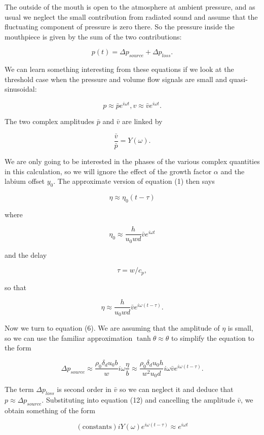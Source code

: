   The outside of the mouth is open to the atmosphere at ambient pressure, and 
  as usual we neglect the small contribution from radiated sound and assume 
  that the fluctuating component of pressure is zero there. So the pressure 
  inside the mouthpiece is given by the sum of the two contributions: 

  $$p(t)=\Delta p_{source} + \Delta p_{loss} . \tag{10}$$ 

  We can learn something interesting from these equations if we look at the 
  threshold case when the pressure and volume flow signals are small and 
  quasi-sinusoidal: 

  $$p \approx \bar{p}e^{i \omega t}, v \approx \bar{v}e^{i \omega t} . 
  \tag{11}$$ 

  The two complex amplitudes $\bar{p}$ and $\bar{v}$ are linked by 

  $$\dfrac{\bar{v}}{\bar{p}} = Y(\omega) . \tag{12}$$ 

  We are only going to be interested in the phases of the various complex 
  quantities in this calculation, so we will ignore the effect of the growth 
  factor $\alpha$ and the labium offset $y_0$. The approximate version of 
  equation (1) then says 

  $$\eta \approx \eta_0(t-\tau) \tag{13}$$ 

  where 

  $$\eta_0 \approx \dfrac{h}{u_0 w d} \bar{v} e^{i \omega t} \tag{14}$$ 

  and the delay 

  $$\tau=w/c_p, \tag{15}$$ 

  so that 

  $$\eta \approx \dfrac{h}{u_0 w d} \bar{v} e^{i \omega (t-\tau)} . \tag{16}$$ 

  Now we turn to equation (6). We are assuming that the amplitude of $\eta$ is 
  small, so we can use the familiar approximation $\tanh \theta \approx \theta$ 
  to simplify the equation to the form 

  $$\Delta p_{source} \approx \dfrac{\rho_0 \delta_d u_0 b}{w} i \omega 
  \dfrac{\eta}{b} \approx \dfrac{\rho_0 \delta_d u_0 h}{w^2 u_0 d} i \omega 
  \bar{v} e^{i \omega (t-\tau)} . \tag{17}$$ 

  The term $\Delta p_{loss}$ is second order in $\bar{v}$ so we can neglect it 
  and deduce that $p \approx \Delta p_{source}$. Substituting into equation 
  (12) and cancelling the amplitude $\bar{v}$, we obtain something of the form 

  $$(\mathrm{constants})i Y(\omega) e^{i \omega (t-\tau)} \approx e^{i \omega 
  t} \tag{18}$$ 

